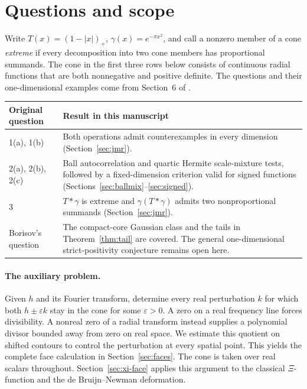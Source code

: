 \documentclass[11pt,a4paper]{article}
\numberwithin{equation}{section}
\begin{document}
\section*{Questions and scope}
Write $T(x)=(1-|x|)_+$, $\gamma(x)=e^{-\pi x^2}$, and call a nonzero member of a cone \emph{extreme} if every decomposition into two cone members has proportional summands. The cone in the first three rows below consists of continuous radial functions that are both nonnegative and positive definite. The questions and their one-dimensional examples come from Section~6 of \cite{JMR2009}.
\begin{center}\small\begin{tabular}{@{}p{.20\linewidth}p{.71\linewidth}@{}}\toprule
Original question & Result in this manuscript \\ \midrule
1(a), 1(b) & Both operations admit counterexamples in every dimension (Section~\ref{sec:jmr}).\\
2(a), 2(b), 2(c) & Ball autocorrelation and quartic Hermite scale-mixture tests, followed by a fixed-dimension criterion valid for signed functions (Sections~\ref{sec:ballmix}--\ref{sec:signed}).\\
3 & $T*\gamma$ is extreme and $\gamma(T*\gamma)$ admits two nonproportional summands (Section~\ref{sec:jmr}).\\
Borisov's question & The compact-core Gaussian class and the tails in Theorem~\ref{thm:tail} are covered. The general one-dimensional strict-positivity conjecture remains open here.\\ \bottomrule
\end{tabular}\end{center}

\paragraph{The auxiliary problem.} Given $h$ and its Fourier transform, determine every real perturbation $k$ for which both $h\pm\varepsilon k$ stay in the cone for some $\varepsilon>0$. A zero on a real frequency line forces divisibility. A nonreal zero of a radial transform instead supplies a polynomial divisor bounded away from zero on real space. We estimate this quotient on shifted contours to control the perturbation at every spatial point. This yields the complete face calculation in Section~\ref{sec:faces}. The cone is taken over real scalars throughout. Section~\ref{sec:xi-face} applies this argument to the classical $\Xi$-function and the de Bruijn--Newman deformation.
\end{document}
